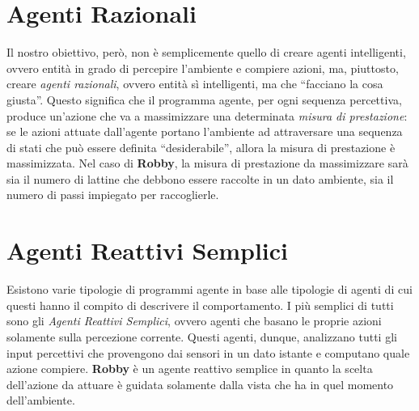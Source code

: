 \section{Agenti Razionali}
Il nostro obiettivo, però, non è semplicemente quello di creare agenti
intelligenti, ovvero entità in grado di percepire l'ambiente e compiere azioni,
ma, piuttosto, creare \textit{agenti razionali}, ovvero entità sì intelligenti,
ma che ``facciano la cosa giusta''. Questo significa che il programma agente,
per ogni sequenza percettiva, produce un'azione che va a massimizzare una
determinata \textit{misura di prestazione}: se le azioni attuate dall'agente
portano l'ambiente ad attraversare una sequenza di stati che può essere definita
``desiderabile'', allora la misura di prestazione è massimizzata.\newline
Nel caso di \textbf{Robby}, la misura di prestazione da massimizzare sarà sia il
numero di lattine che debbono essere raccolte in un dato ambiente, sia il numero
di passi impiegato per raccoglierle.

\section{Agenti Reattivi Semplici}
Esistono varie tipologie di programmi agente in base alle tipologie di agenti
di cui questi hanno il compito di descrivere il comportamento. I più semplici di
tutti sono gli \textit{Agenti Reattivi Semplici}, ovvero agenti che basano le
proprie azioni solamente sulla percezione corrente. Questi agenti, dunque,
analizzano tutti gli input percettivi che provengono dai sensori in un dato
istante e computano quale azione compiere.\newline
\textbf{Robby} è un agente reattivo semplice in quanto la scelta dell'azione da
attuare è guidata solamente dalla vista che ha in quel momento dell'ambiente.

